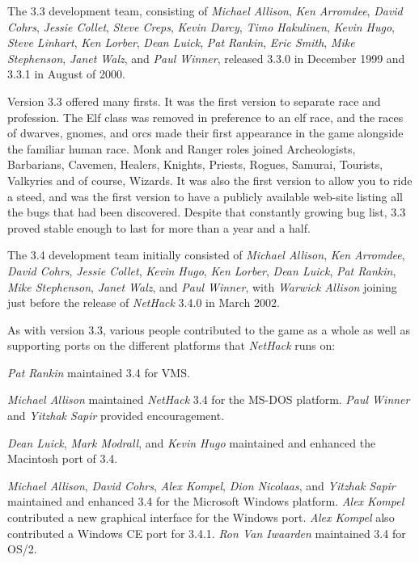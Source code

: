 The 3.3 development team, consisting of {\it Michael Allison}, {\it Ken Arromdee}, 
{\it David Cohrs}, {\it Jessie Collet}, {\it Steve Creps}, {\it Kevin Darcy}, 
{\it Timo Hakulinen}, {\it Kevin Hugo}, {\it Steve Linhart}, {\it Ken Lorber}, 
{\it Dean Luick}, {\it Pat Rankin}, {\it Eric Smith}, {\it Mike Stephenson}, 
{\it Janet Walz}, and {\it Paul Winner}, released 3.3.0 in 
December 1999 and 3.3.1 in August of 2000.

Version 3.3 offered many firsts. It was the first version to separate race 
and profession. The Elf class was removed in preference to an elf race, 
and the races of dwarves, gnomes, and orcs made their first appearance in 
the game alongside the familiar human race.  Monk and Ranger roles joined 
Archeologists, Barbarians, Cavemen, Healers, Knights, Priests, Rogues, Samurai, 
Tourists, Valkyries and of course, Wizards.  It was also the first version
to allow you to ride a steed, and was the first version to have a publicly 
available web-site listing all the bugs that had been discovered.  Despite 
that constantly growing bug list, 3.3 proved stable enough to last for
more than a year and a half.

The 3.4 development team initially consisted of
{\it Michael Allison}, {\it Ken Arromdee},
{\it David Cohrs}, {\it Jessie Collet}, {\it Kevin Hugo}, {\it Ken Lorber},
{\it Dean Luick}, {\it Pat Rankin}, {\it Mike Stephenson}, 
{\it Janet Walz}, and {\it Paul Winner}, with {\it  Warwick Allison\/} joining 
just before the release of {\it NetHack\/} 3.4.0 in March 2002.

As with version 3.3, various people contributed to the game as a whole as
well as supporting ports on the different platforms that {\it NetHack\/} runs on:

{\it Pat Rankin\/} maintained 3.4 for VMS.

{\it Michael Allison\/} maintained {\it NetHack\/} 3.4 for the MS-DOS platform.  {\it Paul Winner\/}
and {\it Yitzhak Sapir\/} provided encouragement.

{\it Dean Luick}, {\it Mark Modrall}, and {\it Kevin Hugo\/} maintained and enhanced the
Macintosh port of 3.4.

{\it Michael Allison}, {\it David Cohrs}, {\it Alex Kompel}, {\it Dion Nicolaas}, and 
{\it Yitzhak Sapir\/} maintained and enhanced 3.4 for the Microsoft Windows platform.
{\it Alex Kompel\/} contributed a new graphical interface for the Windows port. 
{\it Alex Kompel\/} also contributed a Windows CE port for 3.4.1.
{\it Ron Van Iwaarden\/} maintained 3.4 for OS/2.

